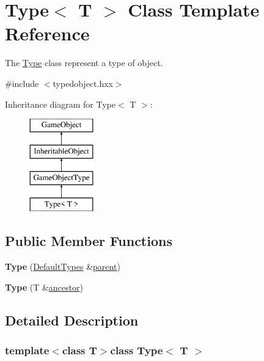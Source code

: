\hypertarget{class_type}{\section{\-Type$<$ \-T $>$ \-Class \-Template \-Reference}
\label{class_type}
}


\-The \hyperlink{class_type}{\-Type} class represent a type of object.  




{\ttfamily \#include $<$typedobject.\-hxx$>$}

\-Inheritance diagram for \-Type$<$ \-T $>$\-:\begin{figure}[H]
\begin{center}
\leavevmode
\includegraphics[height=4.000000cm]{class_type}
\end{center}
\end{figure}
\subsection*{\-Public \-Member \-Functions}
\begin{DoxyCompactItemize}
\item 
\hypertarget{class_type_aea9c6be9b52e1e356ffb0123f2815c21}{{\bfseries \-Type} (\hyperlink{class_default_types}{\-Default\-Types} \&\hyperlink{class_game_object_af3deaf39cde23c189765634e32e95bb4}{parent})}\label{class_type_aea9c6be9b52e1e356ffb0123f2815c21}

\item 
\hypertarget{class_type_a8d71537af478aaedd7aaab6b50e5bfb9}{{\bfseries \-Type} (\-T \&\hyperlink{class_inheritable_object_ac87a3c55ca4be252c527a29fe162bb15}{ancestor})}\label{class_type_a8d71537af478aaedd7aaab6b50e5bfb9}

\end{DoxyCompactItemize}


\subsection{\-Detailed \-Description}
\subsubsection*{template$<$class \-T$>$class Type$<$ T $>$}


